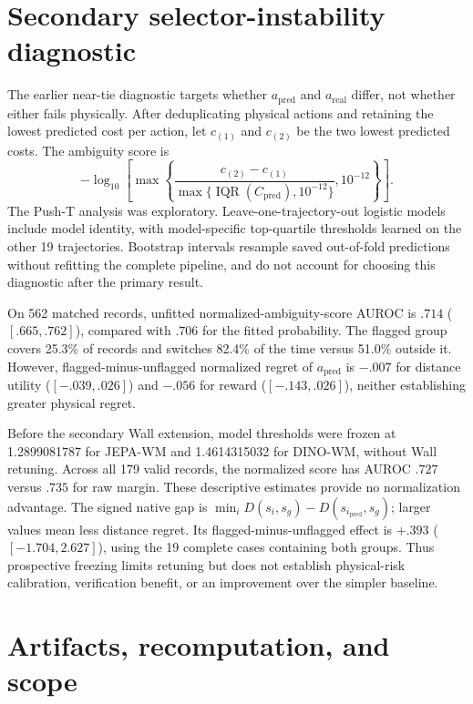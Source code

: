 \section{Secondary selector-instability diagnostic}
\label{app:neartie}

The earlier near-tie diagnostic targets whether $a_{\mathrm{pred}}$ and
$a_{\mathrm{real}}$ differ, not whether either fails physically. After
deduplicating physical actions and retaining the lowest predicted cost per
action, let $c_{(1)}$ and $c_{(2)}$ be the two lowest predicted costs.
The ambiguity score is
\begin{equation}
 -\log_{10}\!\left[\max\!\left\{
 \frac{c_{(2)}-c_{(1)}}{\max\{\operatorname{IQR}(C_{\mathrm{pred}}),10^{-12}\}},
 10^{-12}\right\}\right].
\end{equation}
The Push-T analysis was exploratory. Leave-one-trajectory-out logistic models
include model identity, with model-specific top-quartile thresholds learned
on the other 19 trajectories. Bootstrap intervals resample saved out-of-fold
predictions without refitting the complete pipeline, and do not account for
choosing this diagnostic after the primary result.

On 562 matched records, unfitted normalized-ambiguity-score AUROC is $.714$ ($[.665,.762]$), compared
with $.706$ for the fitted probability. The flagged group covers 25.3\% of
records and switches 82.4\% of the time versus 51.0\% outside it. However,
flagged-minus-unflagged normalized regret of $a_{\mathrm{pred}}$ is $-.007$ for distance utility
($[-.039,.026]$) and $-.056$ for reward ($[-.143,.026]$), neither establishing
greater physical regret.

Before the secondary Wall extension, model thresholds were frozen at
1.2899081787 for JEPA-WM and 1.4614315032 for DINO-WM, without Wall retuning.
Across all 179 valid records, the normalized score has AUROC $.727$ versus
$.735$ for raw margin. These descriptive estimates provide no normalization
advantage. The signed native gap is
$\min_iD(s_i,s_g)-D(s_{i_{\mathrm{pred}}},s_g)$; larger values mean less distance regret.
Its flagged-minus-unflagged effect is $+.393$
($[-1.704,2.627]$), using the 19 complete cases containing both groups.
Thus prospective freezing limits retuning but does not establish physical-risk
calibration, verification benefit, or an improvement over the simpler baseline.

\section{Artifacts, recomputation, and scope}
\label{app:repro}

